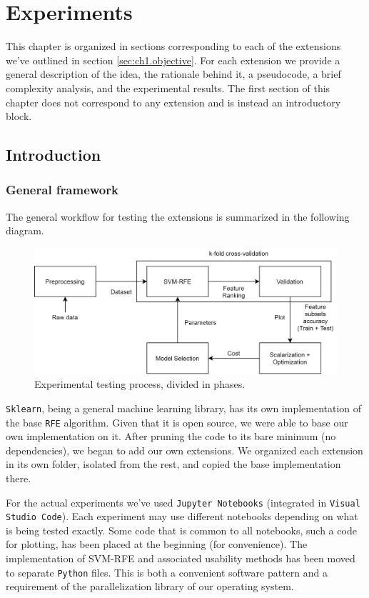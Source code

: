 \chapter{Experiments}
\label{Chapter5}

This chapter is organized in sections corresponding to each of the extensions we've outlined in section \ref{sec:ch1.objective}. For each extension we provide a general description of the idea, the rationale behind it, a pseudocode, a brief complexity analysis, and the experimental results. The first section of this chapter does not correspond to any extension and is instead an introductory block.

\section{Introduction}

\subsection{General framework}

The general workflow for testing the extensions is summarized in the following diagram.

\begin{figure}[h]
    \centering
    \includegraphics[width=0.8\linewidth]{img/ch5/diag.png}
    \caption[Diagram of the experimental testing process]{Experimental testing process, divided in phases.}
    \label{fig:ch5.diag}
\end{figure}

\texttt{Sklearn}, being a general machine learning library, has its own implementation of the base \texttt{RFE} algorithm. Given that it is open source, we were able to base our own implementation on it. After pruning the code to its bare minimum (no dep\-en\-den\-cies), we began to add our own extensions. We organized each extension in its own folder, isolated from the rest, and copied the base implementation there.

For the actual experiments we've used \texttt{Jupyter Notebooks} (integrated in \texttt{Visual Studio Code}). Each experiment may use different notebooks depending on what is being tested exactly. Some code that is common to all notebooks, such a code for plotting, has been placed at the beginning (for convenience). The implementation of SVM-RFE and associated usability methods has been moved to separate \texttt{Python} files. This is both a convenient software pattern and a requirement of the parallelization library of our operating system.

